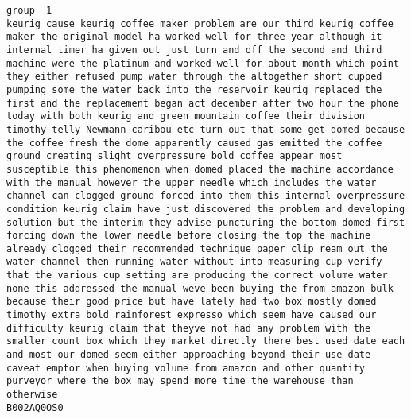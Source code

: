 \documentclass[11pt]{article}
\begin{document}
\begin{Verbatim}[commandchars=\\\{\}]
group  1
keurig cause keurig coffee maker problem are our third keurig coffee maker the original model ha worked well for three year although it internal timer ha given out just turn and off the second and third machine were the platinum and worked well for about month which point they either refused pump water through the altogether short cupped pumping some the water back into the reservoir keurig replaced the first and the replacement began act december after two hour the phone today with both keurig and green mountain coffee their division timothy telly Newmann caribou etc turn out that some get domed because the coffee fresh the dome apparently caused gas emitted the coffee ground creating slight overpressure bold coffee appear most susceptible this phenomenon when domed placed the machine accordance with the manual however the upper needle which includes the water channel can clogged ground forced into them this internal overpressure condition keurig claim have just discovered the problem and developing solution but the interim they advise puncturing the bottom domed first forcing down the lower needle before closing the top the machine already clogged their recommended technique paper clip ream out the water channel then running water without into measuring cup verify that the various cup setting are producing the correct volume water none this addressed the manual weve been buying the from amazon bulk because their good price but have lately had two box mostly domed timothy extra bold rainforest expresso which seem have caused our difficulty keurig claim that theyve not had any problem with the smaller count box which they market directly there best used date each and most our domed seem either approaching beyond their use date caveat emptor when buying volume from amazon and other quantity purveyor where the box may spend more time the warehouse than otherwise
B002AQ0OS0


\end{Verbatim}
\end{document}

